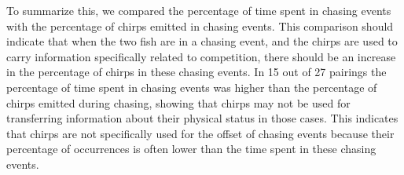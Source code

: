 To summarize this, we compared the percentage of time spent in chasing events with the percentage of chirps emitted in chasing events. This comparison should indicate that when the two fish are in a chasing event, and the chirps are used to carry information specifically related to competition, there should be an increase in the percentage of chirps in these chasing events. In 15 out of 27 pairings the percentage of time spent in chasing events was higher than the percentage of chirps emitted during chasing, showing that chirps may not be used for transferring information about their physical status in those cases. This indicates that chirps are not specifically used for the offset of chasing events because their percentage of occurrences is often lower than the time spent in these chasing events. 

